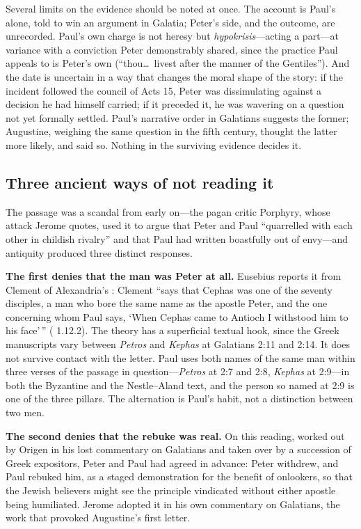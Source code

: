 Several limits on the evidence should be noted at once. The account is
Paul's alone, told to win an argument in Galatia; Peter's side, and the
outcome, are unrecorded. Paul's own charge is not heresy but
\textit{hypokrisis}---acting a part---at variance with a conviction Peter
demonstrably shared, since the practice Paul appeals to is Peter's own
(``thou\ldots\ livest after the manner of the Gentiles''). And the date is
uncertain in a way that changes the moral shape of the story: if the incident
followed the council of Acts 15, Peter was dissimulating against a decision
he had himself carried; if it preceded it, he was wavering on a question not
yet formally settled. Paul's narrative order in Galatians suggests the
former; Augustine, weighing the same question in the fifth century, thought
the latter more likely, and said so. Nothing in the surviving evidence
decides it.

\subsection{Three ancient ways of not reading it}

The passage was a scandal from early on---the pagan critic Porphyry, whose
attack Jerome quotes, used it to argue that Peter and Paul ``quarrelled with
each other in childish rivalry'' and that Paul had written boastfully out of
envy---and antiquity produced three distinct responses.

\textbf{The first denies that the man was Peter at all.} Eusebius reports it
from Clement of Alexandria's : Clement ``says that Cephas
was one of the seventy disciples, a man who bore the same name as the apostle
Peter, and the one concerning whom Paul says, `When Cephas came to Antioch I
withstood him to his face'\,'' ( 1.12.2). The theory has
a superficial textual hook, since the Greek manuscripts vary between
\textit{Petros} and \textit{Kephas} at Galatians 2:11 and 2:14. It does not
survive contact with the letter. Paul uses both names of the same man within
three verses of the passage in question---\textit{Petros} at 2:7 and 2:8,
\textit{Kephas} at 2:9---in both the Byzantine and the Nestle--Aland text,
and the person so named at 2:9 is one of the three pillars. The alternation
is Paul's habit, not a distinction between two men.

\textbf{The second denies that the rebuke was real.} On this reading, worked
out by Origen in his lost commentary on Galatians and taken over by a
succession of Greek expositors, Peter and Paul had agreed in advance: Peter
withdrew, and Paul rebuked him, as a staged demonstration for the benefit of
onlookers, so that the Jewish believers might see the principle vindicated
without either apostle being humiliated. Jerome adopted it in his own
commentary on Galatians, the work that provoked Augustine's first letter.

